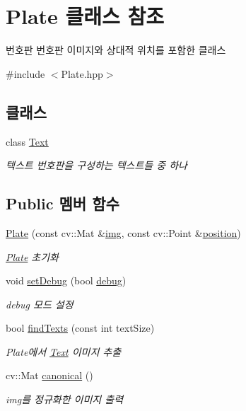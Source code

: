 \hypertarget{class_plate}{}\section{Plate 클래스 참조}
\label{class_plate}


번호판 번호판 이미지와 상대적 위치를 포함한 클래스  




{\ttfamily \#include $<$Plate.\+hpp$>$}

\subsection*{클래스}
\begin{DoxyCompactItemize}
\item 
class \hyperlink{class_plate_1_1_text}{Text}
\begin{DoxyCompactList}\small\item\em 텍스트 번호판을 구성하는 텍스트들 중 하나 \end{DoxyCompactList}\end{DoxyCompactItemize}
\subsection*{Public 멤버 함수}
\begin{DoxyCompactItemize}
\item 
\hyperlink{class_plate_a90e24aeb2c5f3120d3958999b5c673a7}{Plate} (const cv\+::\+Mat \&\hyperlink{class_plate_a51ae6ecac15e4d8b6c8f6a1f6438e84b}{img}, const cv\+::\+Point \&\hyperlink{class_plate_a9176604a4d578e74c085c6b77cef1fef}{position})
\begin{DoxyCompactList}\small\item\em \hyperlink{class_plate}{Plate} 초기화 \end{DoxyCompactList}\item 
void \hyperlink{class_plate_a4f307c5bc7cf3c5887d704fbeed3fd8a}{set\+Debug} (bool \hyperlink{class_plate_a4a417008bf85e65e2aed473f09f96b61}{debug})
\begin{DoxyCompactList}\small\item\em debug 모드 설정 \end{DoxyCompactList}\item 
bool \hyperlink{class_plate_aa18c9cc52a8a756d019faf82cd93ce13}{find\+Texts} (const int text\+Size)
\begin{DoxyCompactList}\small\item\em Plate에서 \hyperlink{class_plate_1_1_text}{Text} 이미지 추출 \end{DoxyCompactList}\item 
cv\+::\+Mat \hyperlink{class_plate_a950683b0823941cc49dd1289ea1fa259}{canonical} ()
\begin{DoxyCompactList}\small\item\em img를 정규화한 이미지 출력 \end{DoxyCompactList}\end{DoxyCompactItemize}
